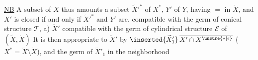 \uline{NB} A subset  of $X$ thus amounts  a
subset $\widetilde X'^*$ of $X^*$, $Y'$ of $Y$, having $=$
 in $\dot X$, and $X'$ is closed if and only if
$\widetilde X'^*$ and $Y'$ are. 
compatible with the germ of
conical structure $\mathcal T$, 
a) $\widetilde X'$ compatible with the germ of
cylindrical structure $\mathcal E$ of $(\widetilde X,\dot X)$
It is then appropriate to  $\widetilde X'$ by
$\inserted{\widetilde X'_1}\,\overline{X'\cap X^{\unsure{*|\epsilon}}}$
( $X^*=\widetilde X\setminus\dot X$), and the germ of $\widetilde X'_1$ in the neighborhood
